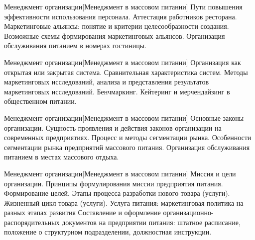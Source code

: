 \documentclass[
	11pt,
	a4paper,
	]
	{article}
\begin{document}
\begin{minipage}[t][\miniH]{\miniL}\centering
	 {Менеджмент организации}[Менеджмент в массовом питании]
		{
			Пути повышения эффективности использования персонала. Аттестация работников ресторана.
		}{
			Маркетинговые альянсы: понятие и критерии целесообразности создания. Возможные схемы формирования маркетинговых альянсов.
		}{
			Организация обслуживания питанием в номерах гостиницы.
		}
	\lowGE
\end{minipage}

\vfill



\begin{minipage}[t][\miniH]{\miniL}\centering
	 {Менеджмент организации}[Менеджмент в массовом питании]
		{
			Организация как открытая или закрытая система. Сравнительная характеристика систем.
		}{
			Методы маркетинговых исследований, анализа и представления результатов маркетинговых исследований. Бенчмаркинг.
		}{
			Кейтеринг и мерчендайзинг в общественном питании.
		}
	\lowGE
\end{minipage}





\begin{minipage}[t][\miniH]{\miniL}\centering
	 {Менеджмент организации}[Менеджмент в массовом питании]
		{
			Основные законы организации. Сущность проявления и действия законов организации на современных предприятиях.
		}{
			Процесс и методы сегментации рынка. Особенности сегментации рынка предприятий массового питания.
		}{
			Организация обслуживания питанием в местах массового отдыха.
		}
	\lowGE
\end{minipage}

\vfill



\begin{minipage}[t][\miniH]{\miniL}\centering
	 {Менеджмент организации}[Менеджмент в массовом питании]
		{
			Миссия и цели организации. Принципы формулирования миссии предприятия питания. Формирование целей.
		}{
			Этапы процесса разработки нового товара (услуги). Жизненный цикл товара (услуги). Услуга питания: маркетинговая политика на разных этапах развития
		}{
			Составление и оформление организационно-распорядительных документов на предприятии питания: штатное расписание, положение о структурном подразделении, должностная инструкции.
		}
	\lowGE
\end{minipage}
\end{document}
